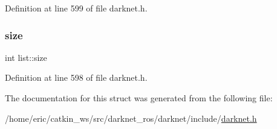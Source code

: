 Definition at line 599 of file darknet.\+h.

\mbox{\label{structlist_a3b03adad0c0429bae9493667ff366dc2}} 
\subsubsection{\texorpdfstring{size}{size}}
{\footnotesize\ttfamily int list\+::size}



Definition at line 598 of file darknet.\+h.



The documentation for this struct was generated from the following file\+:\begin{DoxyCompactItemize}
\item 
/home/eric/catkin\+\_\+ws/src/darknet\+\_\+ros/darknet/include/\mbox{\hyperlink{darknet_8h}{darknet.\+h}}\end{DoxyCompactItemize}
